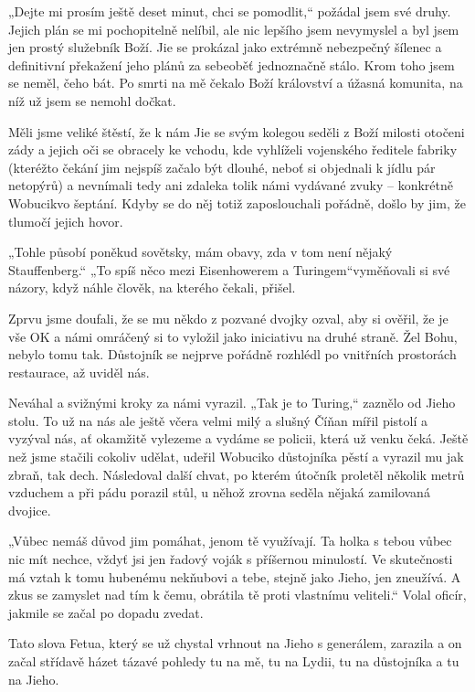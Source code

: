 „Dejte mi prosím ještě deset minut, chci se pomodlit,“ požádal jsem své druhy. Jejich plán se mi pochopitelně nelíbil, ale nic lepšího jsem nevymyslel a byl jsem jen prostý služebník Boží. Jie se prokázal jako extrémně nebezpečný šílenec a definitivní překažení jeho plánů za sebeoběť jednoznačně stálo. Krom toho jsem se neměl, čeho bát. Po smrti na mě čekalo Boží království a úžasná komunita, na níž už jsem se nemohl dočkat.

Měli jsme veliké štěstí, že k nám Jie se svým kolegou seděli z Boží milosti otočeni zády a jejich oči se obracely ke vchodu, kde vyhlíželi vojenského ředitele fabriky (kteréžto čekání jim nejspíš začalo být dlouhé, neboť si objednali k jídlu pár netopýrů) a nevnímali tedy ani zdaleka tolik námi vydávané zvuky – konkrétně Wobucikvo šeptání. Kdyby se do něj totiž zaposlouchali pořádně, došlo by jim, že tlumočí jejich hovor.

 „Tohle působí poněkud sovětsky, mám obavy, zda v tom není nějaký Stauffenberg.“ „To spíš něco mezi Eisenhowerem a Turingem“vyměňovali si své názory, když náhle člověk, na kterého čekali, přišel.

Zprvu jsme doufali, že se mu někdo z pozvané dvojky ozval, aby si ověřil, že je vše OK a námi omráčený si to vyložil jako iniciativu na druhé straně. Žel Bohu, nebylo tomu tak. Důstojník se nejprve pořádně rozhlédl po vnitřních prostorách restaurace, až uviděl nás.

Neváhal a svižnými kroky za námi vyrazil. „Tak je to Turing,“ zaznělo od Jieho stolu. To už na nás ale ještě včera velmi milý a slušný Číňan mířil pistolí a vyzýval nás, ať okamžitě vylezeme a vydáme se policii, která už venku čeká.
Ještě než jsme stačili cokoliv udělat, udeřil Wobuciko důstojníka pěstí a vyrazil mu jak zbraň, tak dech. Následoval další chvat, po kterém útočník proletěl několik metrů vzduchem a při pádu porazil stůl, u něhož zrovna seděla nějaká zamilovaná dvojice.

„Vůbec nemáš důvod jim pomáhat, jenom tě využívají. Ta holka s tebou vůbec nic mít nechce, vždyť jsi jen řadový voják s příšernou minulostí. Ve skutečnosti má vztah k tomu hubenému nekňubovi a tebe, stejně jako Jieho, jen zneužívá. A zkus se zamyslet nad tím k čemu, obrátila tě proti vlastnímu veliteli.“ Volal oficír, jakmile se začal po dopadu zvedat.

Tato slova Fetua, který se už chystal vrhnout na Jieho s generálem, zarazila a on začal střídavě házet tázavé pohledy tu na mě, tu na Lydii, tu na důstojníka a tu na Jieho.

